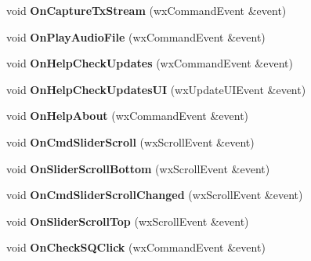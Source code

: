 \begin{DoxyCompactItemize}
\item 
\hypertarget{class_main_frame_ac4bb829b48fa6e931098436e87c5fd8c}{void {\bfseries On\-Capture\-Tx\-Stream} (wx\-Command\-Event \&event)}\label{class_main_frame_ac4bb829b48fa6e931098436e87c5fd8c}

\item 
\hypertarget{class_main_frame_ae0c35052e6bb6642ebbbe5c8de7be68e}{void {\bfseries On\-Play\-Audio\-File} (wx\-Command\-Event \&event)}\label{class_main_frame_ae0c35052e6bb6642ebbbe5c8de7be68e}

\item 
\hypertarget{class_main_frame_ac7eac67418976a65c8fc98e12924042b}{void {\bfseries On\-Help\-Check\-Updates} (wx\-Command\-Event \&event)}\label{class_main_frame_ac7eac67418976a65c8fc98e12924042b}

\item 
\hypertarget{class_main_frame_ae82ea0e5f4f7299d52943ea6b85aa957}{void {\bfseries On\-Help\-Check\-Updates\-U\-I} (wx\-Update\-U\-I\-Event \&event)}\label{class_main_frame_ae82ea0e5f4f7299d52943ea6b85aa957}

\item 
\hypertarget{class_main_frame_a1761b6b588beed7b8965d9b0b2b561cc}{void {\bfseries On\-Help\-About} (wx\-Command\-Event \&event)}\label{class_main_frame_a1761b6b588beed7b8965d9b0b2b561cc}

\item 
\hypertarget{class_main_frame_a844e8058f4e8869af084cb35643a0c6c}{void {\bfseries On\-Cmd\-Slider\-Scroll} (wx\-Scroll\-Event \&event)}\label{class_main_frame_a844e8058f4e8869af084cb35643a0c6c}

\item 
\hypertarget{class_main_frame_aeda570594ad6ca298ade6b2dec5812c4}{void {\bfseries On\-Slider\-Scroll\-Bottom} (wx\-Scroll\-Event \&event)}\label{class_main_frame_aeda570594ad6ca298ade6b2dec5812c4}

\item 
\hypertarget{class_main_frame_a09fe6aa48627dd153964d44e9d80afa0}{void {\bfseries On\-Cmd\-Slider\-Scroll\-Changed} (wx\-Scroll\-Event \&event)}\label{class_main_frame_a09fe6aa48627dd153964d44e9d80afa0}

\item 
\hypertarget{class_main_frame_af7e0da6a850c5f08fd726280b7dc0af4}{void {\bfseries On\-Slider\-Scroll\-Top} (wx\-Scroll\-Event \&event)}\label{class_main_frame_af7e0da6a850c5f08fd726280b7dc0af4}

\item 
\hypertarget{class_main_frame_a648c966a7d7ba7c86b0c404cb8f97361}{void {\bfseries On\-Check\-S\-Q\-Click} (wx\-Command\-Event \&event)}\label{class_main_frame_a648c966a7d7ba7c86b0c404cb8f97361}


\end{DoxyCompactItemize}
